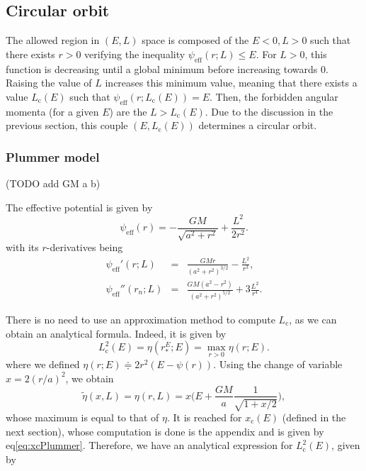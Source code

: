 \documentclass[11pt]{article}
\newcommand{\rc}{\mathrm{c}}
\newcommand{\psieff}{\psi_{\mathrm{eff}}}
\newcommand{\Lc}{L_{\rc}}
\newcommand{\xc}{x_{\rc}}
\begin{document}
\subsection{Circular orbit}
\label{subsec:Circular_Energy}

 The allowed region in $(E,L)$ space is composed of the
$E < 0 , L> 0$ such that there exists $r>0$ verifying the inequality
$\psieff(r;L)\leq E$. For $L>0$, this function  is decreasing until a global
minimum before increasing towards $0$. Raising the value of $L$
increases this minimum value, meaning that there exists a value $\Lc(E)$
such that $\psieff(r;\Lc(E))=E$. Then, the forbidden angular
momenta (for a given $E$) are the $L>\Lc(E)$. Due to the
discussion in the previous section, this couple $(E,\Lc(E))$
determines a circular orbit.


\subsubsection{Plummer model}
\label{subsubsec:PlummerCircularOrbit}

(TODO add GM a b)

The effective potential is given by
$$\psieff(r) = - \frac{GM}{\sqrt{a^{2}+r^{2}}} + \frac{L^{2}}{2r^{2}}.$$
with its $r$-derivatives being
\begin{equation}
\begin{array}{ccl}
 \psieff'(r;L) & =& \displaystyle{\frac{GMr}{(a^{2}+r^{2})^{3/2}}-\frac{L^{2}}{r^{3}}} ,\\
  
  \psieff''(r_{n};L) & =&\displaystyle{\frac{GM(a^{2}-r^{2})}{(a^{2}+r^{2})^{5/2}}+3\frac{L^{2}}{r^{4}}} .
\end{array}
\label{eq:psieff_derivatives}
\end{equation}

There is no need to use an approximation method to compute $\Lc$, as we can obtain an analytical formula. Indeed, it is given by
\begin{equation}
\Lc^{2}(E)=\eta(r_{*}^{E};E)=\max_{r>0}\eta(r;E).
\label{eq:angular_circular}
\end{equation}
where we defined $\eta(r;E)\doteqdot 2 r^{2}(E-\psi(r))$. Using the change of variable $x=2(r/a)^{2}$, we obtain 
$$\tilde{\eta}(x,L)=\eta(r,L)=x\bigg(E+\frac{GM}{a}\frac{1}{\sqrt{1+x/2}}\bigg),$$
 whose maximum is equal to that of $\eta$. It is reached for $\xc(E)$ (defined in the next section), whose computation is done is the appendix and is given by eq\eqref{eq:xcPlummer}. Therefore, we have an analytical expression for $\Lc^{2}(E)$, given by
\end{document}
